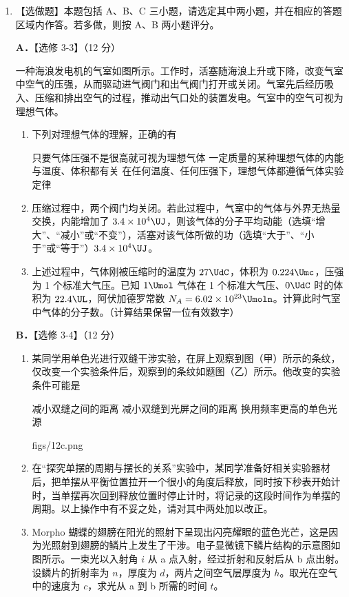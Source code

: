 \documentclass[\gkver]{gaokaozhenti}
\begin{document}
\begin{enumerate}
\item
【选做题】本题包括 A、B、C 三小题，请选定其中两小题，并在相应的答题区域内作答。若多做，则按 A、B 两小题评分。

\textbf{A．}【选修 3-3】（12 分）

一种海浪发电机的气室如图所示。工作时，活塞随海浪上升或下降，改变气室中空气的压强，从而驱动进气阀门和出气阀门打开或关闭。气室先后经历吸入、压缩和排出空气的过程，推动出气口处的装置发电。气室中的空气可视为理想气体。

\begin{enumerate}
\item
下列对理想气体的理解，正确的有

{只要气体压强不是很高就可视为理想气体}
{一定质量的某种理想气体的内能与温度、体积都有关}
{在任何温度、任何压强下，理想气体都遵循气体实验定律}
\item
压缩过程中，两个阀门均关闭。若此过程中，气室中的气体与外界无热量交换，内能增加了 $3.4\times10^{4}\UJ$，则该气体的分子平均动能（选填“增大”、“减小”或“不变”），活塞对该气体所做的功（选填“大于”、“小于”或“等于”）$3.4\times10^{4}\UJ$。
\item
上述过程中，气体刚被压缩时的温度为 $27\UdC$，体积为 $0.224\Umc$，压强为 1 个标准大气压。已知 $1\Umol$ 气体在 1 个标准大气压、$0\UdC$ 时的体积为 $22.4\UL$，阿伏加德罗常数 $N_{A}=6.02\times10^{23}\Umoln$。计算此时气室中气体的分子数。（计算结果保留一位有效数字）
\end{enumerate}


\textbf{B．}【选修 3-4】（12 分）

\begin{enumerate}
\item
某同学用单色光进行双缝干涉实验，在屏上观察到图（甲）所示的条纹，仅改变一个实验条件后，观察到的条纹如题图（乙）所示。他改变的实验条件可能是

{减小双缝之间的距离}
{减小双缝到光屏之间的距离}
{换用频率更高的单色光源}

{figs/12c.png}
\item
在“探究单摆的周期与摆长的关系”实验中，某同学准备好相关实验器材后，把单摆从平衡位置拉开一个很小的角度后释放，同时按下秒表开始计时，当单摆再次回到释放位置时停止计时，将记录的这段时间作为单摆的周期。以上操作中有不妥之处，请对其中两处加以改正。
\item
Morpho 蝴蝶的翅膀在阳光的照射下呈现出闪亮耀眼的蓝色光芒，这是因为光照射到翅膀的鳞片上发生了干涉。电子显微镜下鳞片结构的示意图如图所示。一束光以入射角 $i$ 从 a 点入射，经过折射和反射后从 b 点出射。设鳞片的折射率为 $n$，厚度为 $d$，两片之间空气层厚度为 $h$。取光在空气中的速度为 $c$，求光从 a 到 b 所需的时间 $t$。
\end{enumerate}


\end{enumerate}
\end{document}
